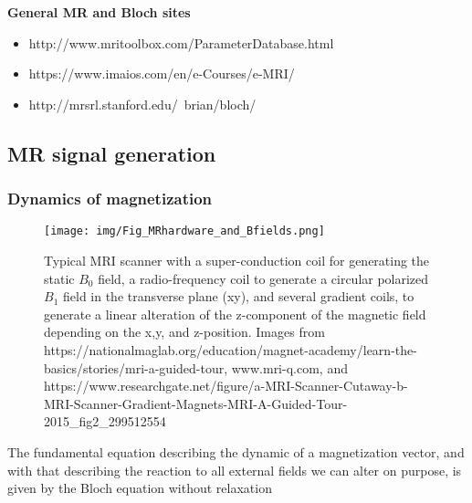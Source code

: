 \documentclass[a4paper,12pt]{extarticle}
\begin{document}
\textbf{General MR and Bloch sites}
\begin{itemize}
\item http://www.mritoolbox.com/ParameterDatabase.html
\item https://www.imaios.com/en/e-Courses/e-MRI/
\item http://mrsrl.stanford.edu/~brian/bloch/
\end{itemize}


 \subsection{MR signal generation}
 \subsubsection{Dynamics of magnetization}
 
 \begin{figure}[!ht] 
\centering
\texttt{[image: img/Fig\_MRhardware\_and\_Bfields.png]}
\caption{Typical MRI scanner with a super-conduction coil for generating the static $B_0$ field, a radio-frequency coil to generate a  circular polarized $B_1$ field in the transverse plane (xy), and several gradient coils, to generate a linear alteration of the z-component of the magnetic field depending on the x,y, and z-position. Images from https://nationalmaglab.org/education/magnet-academy/learn-the-basics/stories/mri-a-guided-tour, www.mri-q.com, and 
https://www.researchgate.net/figure/a-MRI-Scanner-Cutaway-b-MRI-Scanner-Gradient-Magnets-MRI-A-Guided-Tour-2015\_fig2\_299512554
}\label{fig:MRhardware}
\end{figure}
 The fundamental equation describing the dynamic of a magnetization vector, and with that describing the reaction to all external fields we can alter on purpose, is given by the Bloch equation without relaxation
 
\end{document}
